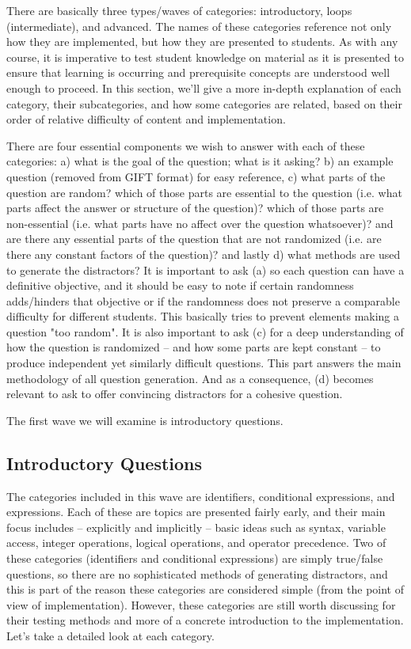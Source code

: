 \documentclass{article}
\begin{document}
There are basically three types/waves of categories: introductory, loops (intermediate), and advanced. The names of these categories reference not only how
they are implemented, but how they are presented to students. As with any course, it is imperative to test student knowledge on material as it is presented
to ensure that learning is occurring and prerequisite concepts are understood well enough to proceed. In this section, we'll give a more in-depth explanation
of each category, their subcategories, and how some categories are related, based on their order of relative difficulty of content and implementation.

There are four essential components we wish to answer with each of these categories: a) what is the goal of the question; what is it asking? b) an example question
(removed from GIFT format) for easy reference, c) what parts of the question are random? which of those parts are essential to the question (i.e. what
parts affect the answer or structure of the question)? which of those parts are non-essential (i.e. what parts have no affect over the question whatsoever)?
and are there any essential parts of the question that are not randomized (i.e. are there any constant factors of the question)? and lastly d) what methods
are used to generate the distractors? It is important to ask (a) so each question can have a definitive objective, and it should be easy to note if
certain randomness adds/hinders that objective or if the randomness does not preserve a comparable difficulty for different students.
This basically tries to prevent elements making a question "too random". It is also important to ask (c) for a deep understanding of how the question
is randomized -- and how some parts are kept constant -- to produce independent yet similarly difficult questions. This part answers the main
methodology of all question generation. And as a consequence, (d) becomes relevant to ask to offer convincing distractors for a cohesive question.

The first wave we will examine is introductory questions.

\subsection{Introductory Questions}
The categories included in this wave are identifiers, conditional expressions, and expressions. Each of these are topics are presented fairly early, and their main
focus includes -- explicitly and implicitly -- basic ideas such as syntax, variable access, integer operations, logical operations, and operator precedence.
Two of these categories (identifiers and conditional expressions) are simply true/false questions, so there are no sophisticated methods of generating
distractors, and this is part of the reason these categories are considered simple (from the point of view of implementation). However, these categories are still
worth discussing for their testing methods and more of a concrete introduction to the implementation. Let's take a detailed look at each category.
\end{document}
